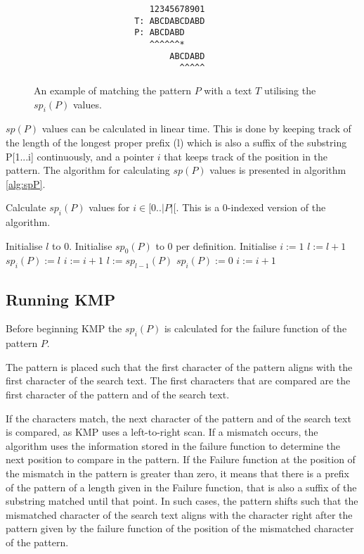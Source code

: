\begin{figure}[H]
\begin{verbatim}
                       12345678901
                    T: ABCDABCDABD
                    P: ABCDABD
                       ^^^^^^*
                           ABCDABD
                             ^^^^^
\end{verbatim}
\caption{An example of matching the pattern $P$ with a text $T$ utilising the $sp_i(P)$ values.}
\label{fig:KMPshift}
\end{figure}

$sp(P)$ values can be calculated in linear time. This is done by keeping track of the length of the longest proper prefix (l) which is also a suffix of the substring P[1...i] continuously, and a pointer $i$ that keeps track of the position in the pattern. The algorithm for calculating $sp(P)$ values is presented in algorithm \ref{alg:spP}.

\begin{algorithm}[t]
\caption{Calculate $sp_i(P)$ values for $i \in [0..|P|[$. This is a $0$-indexed version of the algorithm. }\label{alg:spP}
\begin{algorithmic}
\State Initialise $l$ to 0.
\State Initialise $sp_0(P)$ to 0 per definition.
\State Initialise $i := 1$
        \State $l := l + 1$
        \State $sp_i(P) := l$
        \State $i := i + 1$
    \Else
            \State $l := sp_{l-1}(P)$
        \Else
            \State $sp_{i}(P) := 0$
            \State $i := i + 1$
        \EndIf
    \EndIf
\EndWhile
\end{algorithmic}
\end{algorithm}

\subsection{Running KMP}
Before beginning KMP the $sp_i(P)$ is calculated for the failure function of the pattern $P$. 

The pattern is placed such that the first character of the pattern aligns with the first character of the search text. The first characters that are compared are the first character of the pattern and of the search text. 

If the characters match, the next character of the pattern and of the search text is compared, as KMP uses a left-to-right scan. 
If a mismatch occurs, the algorithm uses the information stored in the failure function to determine the next position to compare in the pattern. If the Failure function at the position of the mismatch in the pattern is greater than zero, it means that there is a prefix of the pattern of a length given in the Failure function, that is also a suffix of the substring matched until that point. In such cases, the pattern shifts such that the mismatched character of the search text aligns with the character right after the pattern given by the failure function of the position of the mismatched character of the pattern.

